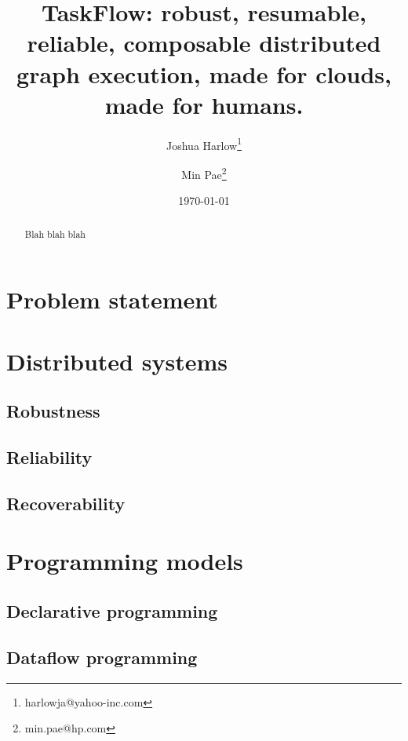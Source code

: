 \documentclass[11pt,a4paper]{article}
\begin{document}
\title{TaskFlow: robust, resumable, reliable, composable distributed graph
       execution, made for clouds, made for humans.}

\author[1]{Joshua Harlow\thanks{harlowja@yahoo-inc.com}}
\author[2]{Min Pae\thanks{min.pae@hp.com}}

\date{\today}

\maketitle

\begin{abstract}

Blah blah blah

\end{abstract}

\section{Problem statement}

\section{Distributed systems}

\subsection{Robustness}

\subsection{Reliability}

\subsection{Recoverability}

\section{Programming models}

\subsection{Declarative programming}

\subsection{Dataflow programming}
\end{document}
